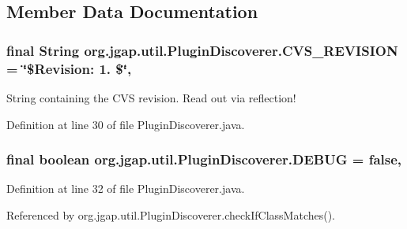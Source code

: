 \subsection{Member Data Documentation}
\hypertarget{classorg_1_1jgap_1_1util_1_1_plugin_discoverer_a6b0e92ff50135d1e259f7e44cf692058}{
\subsubsection[{C\-V\-S\-\_\-\-R\-E\-V\-I\-S\-I\-O\-N}]{\setlength{\rightskip}{0pt plus 5cm}final String org.\-jgap.\-util.\-Plugin\-Discoverer.\-C\-V\-S\-\_\-\-R\-E\-V\-I\-S\-I\-O\-N = \char`\"{}\$Revision\-: 1. \$\char`\"{}\hspace{0.3cm}{\ttfamily [static]}, {\ttfamily [private]}}}\label{classorg_1_1jgap_1_1util_1_1_plugin_discoverer_a6b0e92ff50135d1e259f7e44cf692058}
String containing the C\-V\-S revision. Read out via reflection! 

Definition at line 30 of file Plugin\-Discoverer.\-java.

\hypertarget{classorg_1_1jgap_1_1util_1_1_plugin_discoverer_adc9a10b57d7574fb5cc677f93ad79398}{
\subsubsection[{D\-E\-B\-U\-G}]{\setlength{\rightskip}{0pt plus 5cm}final boolean org.\-jgap.\-util.\-Plugin\-Discoverer.\-D\-E\-B\-U\-G = false\hspace{0.3cm}{\ttfamily [static]}, {\ttfamily [private]}}}\label{classorg_1_1jgap_1_1util_1_1_plugin_discoverer_adc9a10b57d7574fb5cc677f93ad79398}


Definition at line 32 of file Plugin\-Discoverer.\-java.



Referenced by org.\-jgap.\-util.\-Plugin\-Discoverer.\-check\-If\-Class\-Matches().

